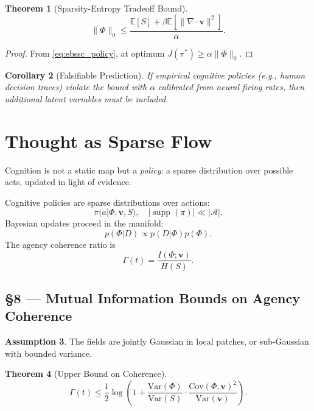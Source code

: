 \documentclass[11pt]{article}
\newtheorem{theorem}{Theorem}[section]
\newtheorem{corollary}[theorem]{Corollary}
\theoremstyle{definition}
\newtheorem{assumption}[theorem]{Assumption}
\theoremstyle{remark}
\newcommand{\vect}[1]{\bm{#1}}
\DeclareMathOperator{\supp}{supp}
\begin{document}
\begin{theorem}[Sparsity-Entropy Tradeoff Bound]
\[
\|\Phi\|_0 \le \frac{\mathbb{E}[S] + \beta \mathbb{E}[\|\nabla \cdot \vect{v}\|^2]}{\alpha}.
\]
\end{theorem}

\begin{proof}
From \eqref{eq:ebssc_policy}, at optimum $J(\pi^*) \ge \alpha \|\Phi\|_0$.
\end{proof}

\begin{corollary}[Falsifiable Prediction]
If empirical cognitive policies (e.g., human decision traces) violate the bound with $\alpha$ calibrated from neural firing rates, then additional latent variables must be included.
\end{corollary}

\section{Thought as Sparse Flow}
Cognition is not a static map but a \emph{policy}: a sparse distribution over possible acts, updated in light of evidence.

Cognitive policies are sparse distributions over actions:
\begin{equation}
\boxed{\pi(a|\Phi,\vect{v},S),\quad |\supp(\pi)|\ll|\mathcal{A}|.}
\end{equation}
Bayesian updates proceed in the manifold:
\begin{equation}
\boxed{p(\Phi|D)\propto p(D|\Phi)p(\Phi).}
\end{equation}
The agency coherence ratio is
\begin{equation}
\boxed{\Gamma(t)=\frac{I(\Phi;\vect{v})}{H(S)}.}
\label{eq:gamma}
\end{equation}

\subsection*{§8 — Mutual Information Bounds on Agency Coherence}

\begin{assumption}
\label{ass:coherence}
The fields are jointly Gaussian in local patches, or sub-Gaussian with bounded variance.
\end{assumption}

\begin{theorem}[Upper Bound on Coherence]
\[
\Gamma(t) \le \frac{1}{2} \log \left(1 + \frac{\mathrm{Var}(\Phi)}{\mathrm{Var}(S)} \cdot \frac{\mathrm{Cov}(\Phi,\vect{v})^2}{\mathrm{Var}(\vect{v})}\right).
\]
\end{theorem}
\end{document}
